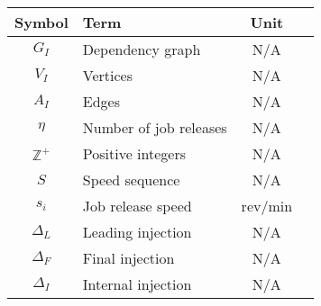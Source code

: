 \begin{center}
\bgroup
\begin{tabular}{| c | l | c | c |}
    \hline
    Symbol & Term & Unit \\  \hline \hline \cline{1-3}
    $G_I$ & Dependency graph & N/A \\ \cline{1-3}
    $V_I$ & Vertices & N/A \\ \cline{1-3}
    $A_I$ & Edges & N/A \\ \cline{1-3}
    $\eta$ & Number of job releases & N/A \\ \cline{1-3}
    $\mathbb{Z}^+$ & Positive integers & N/A \\ \cline{1-3}
    $S$ & Speed sequence & N/A \\ \cline{1-3}
    $s_i$ & Job release speed & rev/min \\ \cline{1-3}
    $\Delta_L$ & Leading injection & N/A \\ \cline{1-3}
    $\Delta_F$ & Final injection & N/A \\ \cline{1-3}
    $\Delta_I$ & Internal injection & N/A \\ \cline{1-3}
    \hline
\end{tabular}
\egroup
\end{center}